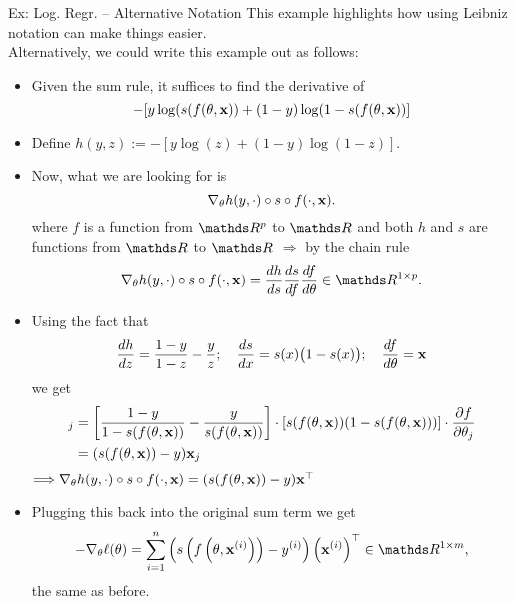 \documentclass[11pt,compress,t,notes=noshow, xcolor=table]{beamer}
\newcommand{\deriv}{d}
\begin{document}
\begin{vbframe}{Ex: Log. Regr. -- Alternative Notation}
This example highlights how using Leibniz notation can make things easier.\\
Alternatively, we could write this example out as follows:
\begin{itemize}
    \item Given the sum rule, it suffices to find the derivative of 
\[
-[y \log (s(f(\theta,\mathbf{x}))+(1-y) \log (1-s(f(\theta,\mathbf{x}))]
\]
\item Define $h(y,z):=-[y \log (z)+(1-y) \log (1-z)]$.
\item Now, what we are looking for is 
\[
\nabla_\theta h(y,\cdot)\circ s \circ f(\cdot,\mathbf{x}).
\]
where $f$ is a function from $\R^p$ to $\R$ and both $h$ and $s$ are functions from $\R$ to $\R$
$\Longrightarrow$ by the chain rule
$$
\nabla_\theta h(y,\cdot)\circ s \circ f(\cdot,\xv)=\frac{\deriv h}{\deriv s} \frac{\deriv s}{\deriv f} \frac{\deriv f}{\deriv \theta}\in\R^{1\times p}.
$$
\end{itemize}\framebreak
\begin{itemize}
    \item Using the fact that $$\frac{\deriv h}{\deriv z}=\frac{1-y}{1-z}-\frac{y}{z};\quad\frac{\deriv s}{\deriv x}=s(x)\big(1-s(x)\big);\quad\frac{\deriv f}{\deriv \theta}=\xv$$ we get \begin{align*}
   [\nabla_\theta h(y,\cdot)\circ s \circ f(\cdot,\xv)]_j&=\left[\frac{1-y}{1-s(f(\theta,\xv))}-\frac{y}{s(f(\theta,\xv))}\right] \cdot \left[s(f(\theta,\xv))(1-s(f(\theta,\xv)))\right]\cdot \frac{\partial f}{\partial\theta_j}\\
   &=(s(f(\theta,\xv))-y)\xv_j
\end{align*}
$\Longrightarrow \nabla_\theta h(y,\cdot)\circ s \circ f(\cdot,\mathbf{x})=(s(f(\theta,\mathbf{x}))-y)\mathbf{x}^\top$
\item Plugging this back into the original sum term we get $$
-\nabla_\theta \ell (\theta)=\sumin\left(s\left(f\left(\theta,\xv^{(i)}\right)\right)-y^{(i)}\right)\left(\xv^{(i)}\right)^\top\in\R^{1\times m},
$$ the same as before.
\end{itemize}
\end{vbframe}



\end{document}
